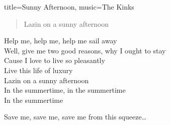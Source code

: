 \begin{song}{title={Sunny Afternoon}, music={The Kinks}}
\begin{verse}
        Lazin\tqs{} on a sunny afternoon
    \end{verse}
    \begin{chorus}
        Help me, help me, help me sail away \\
        Well, give me two good reasons, why I ought to stay \\
        \tqs{}Cause I love to live so pleasantly \\
        Live this life of luxury \\
        Lazin\tqs{} on a sunny afternoon \\
        In the summertime, in the summertime \\
        In the summertime \medskip

        Save me, save me, save me from this squeeze\ldots
    \end{chorus}
\end{song}


